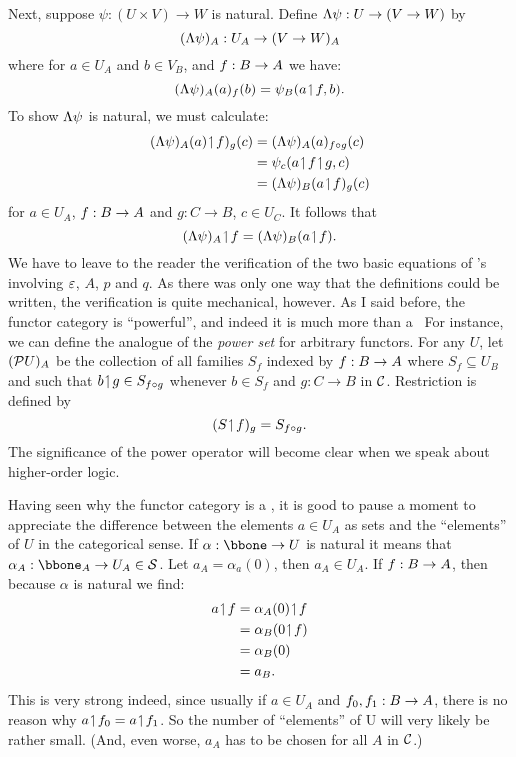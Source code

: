 Next, suppose $\psi: (U \times V) \to W$ is natural. Define $\Lambda \psi  : U\rightarrow (V\rightarrow W)$ by
%
$$
(\Lambda \psi)_A: U_A \rightarrow (V \rightarrow W)_A
$$
%
where for $a \in U_A$ and $b \in V_B$, and $f: B \rightarrow A$ we have:
$$
(\Lambda \psi)_A (a)_f (b) = \psi_B (a \!\upharpoonleft\! f, b).
$$
To show $\Lambda\psi$ is natural, we must calculate:
\begin{align*}
(\L \psi)_A (a)\res f)_g (c) &= (\L \psi)_A(a)_{f \comp g} (c)\\
&= \psi_c(a \res f \res g,c)\\
&= (\L \psi)_B(a \res f)_g (c)
\end{align*}
%
for $a \in U_A$, $f : B \rightarrow A$ and $g: C\to B$, $c \in U_C$. It follows that
$$
(\Lambda \psi)_A \!\upharpoonleft\! f = (\Lambda \psi)_B (a \!\upharpoonleft\! f).
$$
%
We have to leave to the reader the verification of the two basic equations of \ccc's
involving $\varepsilon$, $A$, $p$ and $q$. As there was only one way that the definitions could be
written, the verification is quite mechanical, however. As I said before, the functor
category is ``powerful'', and indeed it is much more than a \ccc\  For instance, we can 
define the analogue of the {\it power set} for arbitrary functors. For any $U$, let
$(\mathcal P U)_A$ be the collection of all families $S_f$ indexed by $f: B \rightarrow A$ where $S_f \subseteq
U_B$ and such that $b\!\upharpoonleft\! g \in S_{f \circ g}$ whenever $b\in S_f$ and $g: C\to B$ in
$\mathcal C$. Restriction is defined by
$$
(S \!\upharpoonleft\! f)_g = S_{f \circ g}.
$$
%
The significance of the power operator will become clear when we speak about higher-order
logic.

Having seen why the functor category is a \ccc, it is good to pause a moment to appreciate
the difference between the elements $a \in U_A$ as sets and the ``elements'' of $U$ in the
categorical sense. If $\alpha : \bbone \to U$ is natural it means that $\alpha_A  :
\bbone_A  \to U_A \in \S$. Let $a_A = \alpha_a(0)$, then $a_A \in U_A$. If $f:B \rightarrow A$, then
because $\alpha$ is natural we find:
\begin{align*}
a \!\upharpoonleft\! f &= \alpha_A(0) \!\upharpoonleft\! f\\
&= \alpha_B(0 \!\upharpoonleft\! f)\\
&= \alpha_B(0)\\
&= a_B .
\end{align*}
This is very strong indeed, since usually if $a \in U_A$ and $f_0, f_1 :B \rightarrow A$, there is no
reason why $a \!\upharpoonleft\! f_0 = a \!\upharpoonleft\! f_1$. So the number of ``elements'' of U will very likely
be rather small. (And, even worse, $a_A$ has to be chosen for all $A$ in $\mathcal C$.)

